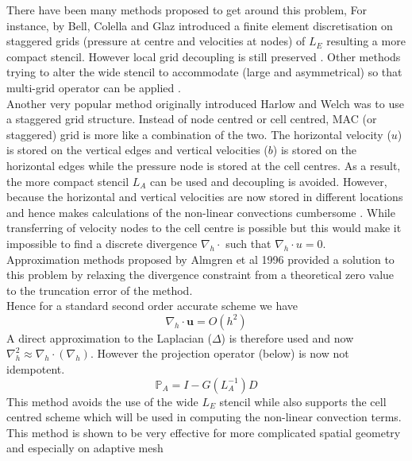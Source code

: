 There have been many methods proposed to get around this problem, For instance, by Bell, Colella and Glaz introduced a finite element discretisation on staggered grids \cite{bell1989second} (pressure at centre and velocities at nodes) of $\textit{L}_E$ resulting a more compact stencil. However local grid decoupling is still preserved \cite{almgren1996numerical,almgren2000approximate}. Other methods trying to alter the wide stencil to accommodate (large and asymmetrical) so that multi-grid operator can be applied \cite{howell1997adaptive}.\\
Another very popular method originally introduced Harlow and Welch \cite{harlow1965numerical} was to use a staggered grid structure. Instead of node centred or cell centred, MAC (or staggered) grid is more like a combination of the two. The horizontal velocity ($\textit{u}$) is stored on the vertical edges and vertical velocities ($\textit{b}$) is stored on the horizontal edges while the pressure node is stored at the cell centres. As a result, the more compact stencil $\textit{L}_A$ can be used and decoupling is avoided. However, because the horizontal and vertical velocities are now stored in different locations and hence makes calculations of the non-linear convections cumbersome \cite{almgren1996numerical,howell1997adaptive}. While transferring of velocity nodes to the cell centre is possible but this would make it impossible to find a discrete divergence $\nabla_h\cdot$ such that $\nabla_h \cdot \textit{u} = 0$.\\

Approximation methods proposed by Almgren et al 1996 \cite{almgren1996numerical} provided a solution to this problem by relaxing the divergence constraint from a theoretical zero value to the truncation error of the method. \\
Hence for a standard second order accurate scheme we have
\begin{equation*}
\nabla_h \cdot \textbf{u} = O(h^2)
\end{equation*}
A direct approximation to the Laplacian ($\Delta$) is therefore used and now $\nabla_h^2\approx \nabla_h \cdot (\nabla_h)$. However the projection operator (below) is now not idempotent.
\begin{equation}
\mathbb{P}_A = I - G(L_A^{-1})D
\end{equation}
This method avoids the use of the wide $\textit{L}_E$ stencil while also supports the cell centred scheme which will be used in computing the non-linear convection terms. This method is shown to be very effective for more complicated spatial geometry and especially on adaptive mesh \cite{howell1997adaptive}\\

